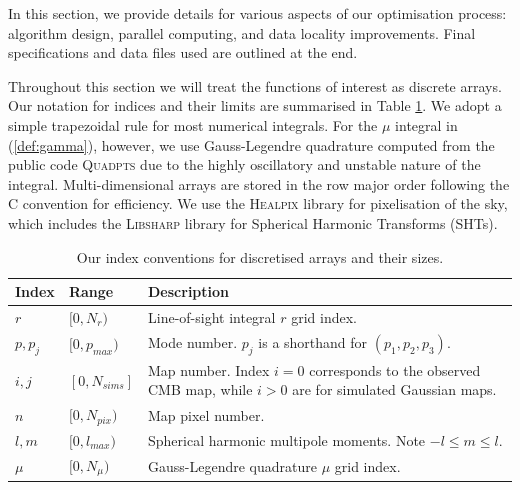 In this section, we provide details for various aspects of our optimisation process: algorithm design, parallel computing, and data locality improvements. Final specifications and data files used are outlined at the end.

Throughout this section we will treat the functions of interest as discrete arrays. Our notation for indices and their limits are summarised in Table \ref{table:index_conventions}. We adopt a simple trapezoidal rule for most numerical integrals. For the $\mu$ integral in (\ref{def:gamma}), however, we use Gauss-Legendre quadrature computed from the public code \textsc{Quadpts} \cite{Hale2013} due to the highly oscillatory and unstable nature of the integral. Multi-dimensional arrays are stored in the row major order following the \textsc{C} convention for efficiency. We use the \textsc{Healpix} library \cite{Gorski2005healpix} for pixelisation of the sky, which includes the \textsc{Libsharp} \cite{Reinecke2013libsharp} library for Spherical Harmonic Transforms (SHTs).

\begin{table}[htbp]
	\caption{Our index conventions for discretised arrays and their sizes.}
	\centering
	\label{table:index_conventions}
	\renewcommand{\arraystretch}{1.5} 
	\begin{tabular}{m{}  m{}  m{}} \toprule
		Index & Range & Description \\
		
		\midrule
		$r$ & $[0, N_r)$ & Line-of-sight integral $r$ grid index. \\
		
		$p, p_j$ & $[0, p_{max})$ & Mode number. $p_j$ is a shorthand for $(p_1, p_2, p_3)$. \\
		
		$i,j$ & $[0, N_{sims}]$ & Map number. Index $i=0$ corresponds to the observed CMB map, while $i>0$ are for simulated Gaussian maps. \\			
		
		$n$ & $[0, N_{pix})$ & Map pixel number. \\ 
		
		$l,m$ & $[0, l_{max})$ & Spherical harmonic multipole moments. Note $-l \le m \le l$. \\
		
		$\mu$ & $[0, N_\mu)$ & Gauss-Legendre quadrature $\mu$ grid index. \\
		
		\bottomrule
	\end{tabular}
\end{table}

